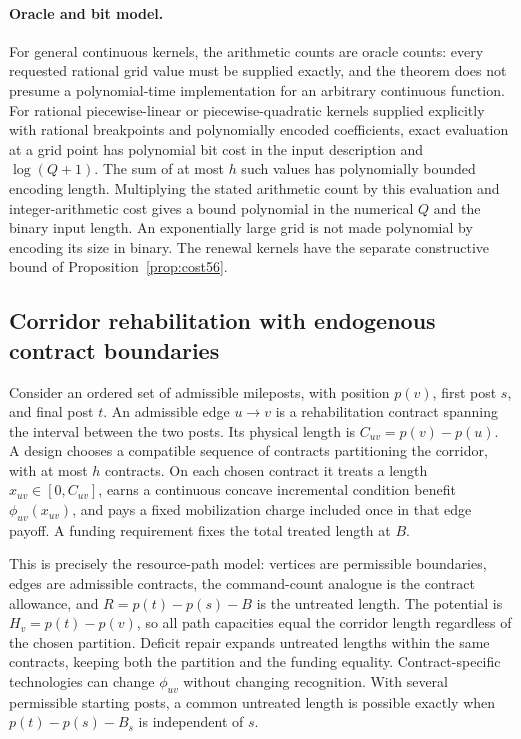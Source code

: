 \documentclass[11pt,letterpaper]{article}
\theoremstyle{definition}\newtheorem{remark}[theorem]{Remark}
\begin{document}
\paragraph{Oracle and bit model.} For general continuous kernels, the arithmetic counts are oracle counts: every requested rational grid value must be supplied exactly, and the theorem does not presume a polynomial-time implementation for an arbitrary continuous function. For rational piecewise-linear or piecewise-quadratic kernels supplied explicitly with rational breakpoints and polynomially encoded coefficients, exact evaluation at a grid point has polynomial bit cost in the input description and $\log(Q+1)$. The sum of at most $h$ such values has polynomially bounded encoding length. Multiplying the stated arithmetic count by this evaluation and integer-arithmetic cost gives a bound polynomial in the numerical $Q$ and the binary input length. An exponentially large grid is not made polynomial by encoding its size in binary. The renewal kernels have the separate constructive bound of Proposition~\ref{prop:cost56}.

\subsection{Corridor rehabilitation with endogenous contract boundaries}\label{sec:corridor60}
Consider an ordered set of admissible mileposts, with position $p(v)$, first post $s$, and final post $t$. An admissible edge $u\to v$ is a rehabilitation contract spanning the interval between the two posts. Its physical length is $C_{uv}=p(v)-p(u)$. A design chooses a compatible sequence of contracts partitioning the corridor, with at most $h$ contracts. On each chosen contract it treats a length $x_{uv}\in[0,C_{uv}]$, earns a continuous concave incremental condition benefit $\phi_{uv}(x_{uv})$, and pays a fixed mobilization charge included once in that edge payoff. A funding requirement fixes the total treated length at $B$.

This is precisely the resource-path model: vertices are permissible boundaries, edges are admissible contracts, the command-count analogue is the contract allowance, and $R=p(t)-p(s)-B$ is the untreated length. The potential is $H_v=p(t)-p(v)$, so all path capacities equal the corridor length regardless of the chosen partition. Deficit repair expands untreated lengths within the same contracts, keeping both the partition and the funding equality. Contract-specific technologies can change $\phi_{uv}$ without changing recognition. With several permissible starting posts, a common untreated length is possible exactly when $p(t)-p(s)-B_s$ is independent of $s$.
\end{document}
